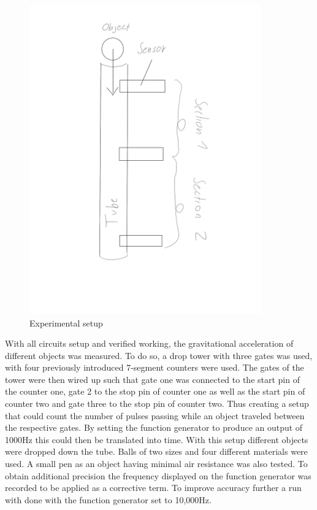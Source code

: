 \documentclass[fleqn,14pt]{article}
\begin{document}
\begin{figure}[H]
  \begin{center}
    \includegraphics[width=10cm]{images/drop-tower.png}
    \caption{Experimental setup}
    \label{fig:figure_drop_tower}
  \end{center}
\end{figure}

With all circuits setup and verified working, the gravitational
acceleration of different objects was measured. To do so, a drop tower with three gates was used, with
four previously introduced 7-segment counters were used. The gates of the tower were then wired up such
that gate one was connected to the start pin of the counter one, gate 2 to the stop pin of counter one as
well as the start pin of counter two and gate three to the stop pin of counter two. Thus creating a
setup that could count the number of pulses passing while an object traveled between the respective gates.
By setting the function generator to produce an output of 1000Hz this could then be translated into time.
With this setup different objects were dropped down the tube. Balls of two sizes and four different materials
were used. A small pen as an object having minimal air resistance was also tested. 
To obtain additional precision the frequency displayed on the function generator was recorded to be applied as
a corrective term. To improve accuracy further a run with done with the function generator set to 10,000Hz.
\end{document}
